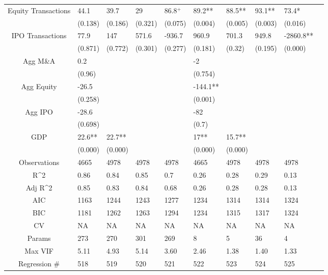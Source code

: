 \documentclass{article}
\begin{document}
\begin{table}[H]
\begin{tabular}{|clllllllll|}
  Equity Transactions & 44.1 & 39.7 & 29 & 86.8$^{+}$ & 89.2** & 88.5** & 93.1** & 73.4* & \\ 
   & (0.138) & (0.186) & (0.321) & (0.075) & (0.004) & (0.005) & (0.003) & (0.016) & \\ 
  IPO Transactions & 77.9 & 147 & 571.6 & -936.7 & 960.9 & 701.3 & 949.8 & -2860.8** & \\ 
   & (0.871) & (0.772) & (0.301) & (0.277) & (0.181) & (0.32) & (0.195) & (0.000) & \\ 
  Agg M\&A & 0.2 &  &  &  & -2 &  &  &  & \\ 
   & (0.96) &  &  &  & (0.754) &  &  &  & \\ 
  Agg Equity & -26.5 &  &  &  & -144.1** &  &  &  & \\ 
   & (0.258) &  &  &  & (0.001) &  &  &  & \\ 
  Agg IPO & -28.6 &  &  &  & -82 &  &  &  & \\ 
   & (0.698) &  &  &  & (0.7) &  &  &  & \\ 
  GDP & 22.6** & 22.7** &  &  & 17** & 15.7** &  &  & \\ 
   & (0.000) & (0.000) &  &  & (0.000) & (0.000) &  &  & \\ 
  \hline 
 Observations & 4665 & 4978 & 4978 & 4978 & 4665 & 4978 & 4978 & 4978 & \\ 
  R^2 & 0.86 & 0.84 & 0.85 & 0.7 & 0.26 & 0.28 & 0.29 & 0.13 & \\ 
  Adj R^2 & 0.85 & 0.83 & 0.84 & 0.68 & 0.26 & 0.28 & 0.28 & 0.13 & \\ 
  AIC & 1163 & 1244 & 1243 & 1277 & 1234 & 1314 & 1314 & 1324 & \\ 
  BIC & 1181 & 1262 & 1263 & 1294 & 1234 & 1315 & 1317 & 1324 & \\ 
  CV & NA & NA & NA & NA & NA & NA & NA & NA & \\ 
  Params & 273 & 270 & 301 & 269 & 8 & 5 & 36 & 4 & \\ 
  Max VIF & 5.11 & 4.93 & 5.14 & 3.60 & 2.46 & 1.38 & 1.40 & 1.33 & \\ 
  Regression \# & 518 & 519 & 520 & 521 & 522 & 523 & 524 & 525 & \\ 
   \hline
\end{tabular}
 
\end{table}
\end{document}
